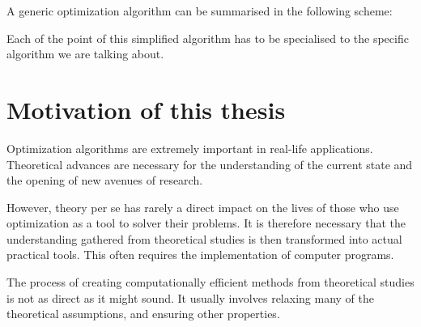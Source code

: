 A generic optimization algorithm can be summarised in the following
scheme:


Each of the point of this simplified algorithm has to be specialised
to the specific algorithm we are talking about.

%
%
\section{Motivation of this thesis}

Optimization algorithms are extremely important in real-life 
applications. Theoretical advances are necessary for the 
understanding of the current state and the opening of new avenues 
of research. 

However, theory per se has rarely a direct impact on the lives 
of those who use optimization as a tool to solver their problems.
It is therefore necessary that the understanding gathered from
theoretical studies is then transformed into actual practical
tools. This often requires the implementation of computer programs.

The process of creating computationally efficient methods from
theoretical studies is not as direct as it might sound. It usually
involves relaxing many of the theoretical assumptions, and ensuring
other properties.

